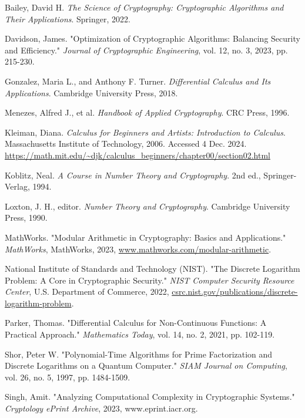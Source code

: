 \documentclass[12pt]{article}
\begin{document}
\renewcommand{\refname}{Works Cited}
\begin{thebibliography}{9}

Bailey, David H. \textit{The Science of Cryptography: Cryptographic Algorithms and Their Applications}. Springer, 2022.

Davidson, James. "Optimization of Cryptographic Algorithms: Balancing Security and Efficiency." \textit{Journal of Cryptographic Engineering}, vol. 12, no. 3, 2023, pp. 215-230.

Gonzalez, Maria L., and Anthony F. Turner. \textit{Differential Calculus and Its Applications}. Cambridge University Press, 2018.

Menezes, Alfred J., et al. \textit{Handbook of Applied Cryptography}. CRC Press, 1996.

Kleiman, Diana. \textit{Calculus for Beginners and Artists: Introduction to Calculus}. Massachusetts Institute of Technology, 2006. Accessed 4 Dec. 2024. \url{https://math.mit.edu/~djk/calculus\_beginners/chapter00/section02.html}

Koblitz, Neal. \textit{A Course in Number Theory and Cryptography}. 2nd ed., Springer-Verlag, 1994.

Loxton, J. H., editor. \textit{Number Theory and Cryptography}. Cambridge University Press, 1990.

MathWorks. "Modular Arithmetic in Cryptography: Basics and Applications." \textit{MathWorks}, MathWorks, 2023, \url{www.mathworks.com/modular-arithmetic}.

National Institute of Standards and Technology (NIST). "The Discrete Logarithm Problem: A Core in Cryptographic Security." \textit{NIST Computer Security Resource Center}, U.S. Department of Commerce, 2022, \url{csrc.nist.gov/publications/discrete-logarithm-problem}.

Parker, Thomas. "Differential Calculus for Non-Continuous Functions: A Practical Approach." \textit{Mathematics Today}, vol. 14, no. 2, 2021, pp. 102-119.

Shor, Peter W. "Polynomial-Time Algorithms for Prime Factorization and Discrete Logarithms on a Quantum Computer." \textit{SIAM Journal on Computing}, vol. 26, no. 5, 1997, pp. 1484-1509.

Singh, Amit. "Analyzing Computational Complexity in Cryptographic Systems." \textit{Cryptology ePrint Archive}, 2023, www.eprint.iacr.org.


\end{thebibliography}
\end{document}
